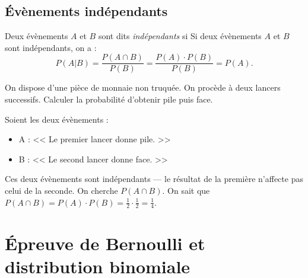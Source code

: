             \subsection{\'Ev\`enements ind\'ependants}
            Deux \'ev\`enements $A$ et $B$ sont dits \emph{ind\'ependants} si 
            Si deux \'ev\`enements $A$ et $B$ sont ind\'ependants, on a :
                  \begin{displaymath}
                        P(A|B) = \frac{P(A\cap B)}{P(B)} = \frac{P(A) \cdot P(B)}{P(B)} = P(A).
                  \end{displaymath}
            \begin{ex}
                  On dispose d'une pi\`ece de monnaie non truqu\'ee.
                  On proc\`ede \`a deux lancers successifs.
                  Calculer la probabilit\'e d'obtenir pile puis face.
                  \begin{valiny}
                        Soient les deux \'ev\`enements : 
                              \begin{itemize}
                                    \item A : << Le premier lancer donne pile. >>
                                    \item B : << Le second lancer donne face. >>
                              \end{itemize}
                        Ces deux \'ev\`enements sont ind\'ependants --- 
                        le r\'esultat de la premi\`ere n'affecte pas celui de la seconde.
                        On cherche $P(A\cap B)$.
                        On sait que 
                        $P(A\cap B) = P(A) \cdot P(B) = \frac{1}{2} \cdot \frac{1}{2} = \frac{1}{4}$.
                  \end{valiny}
            \end{ex}
	\section{\'Epreuve de Bernoulli et distribution binomiale}
